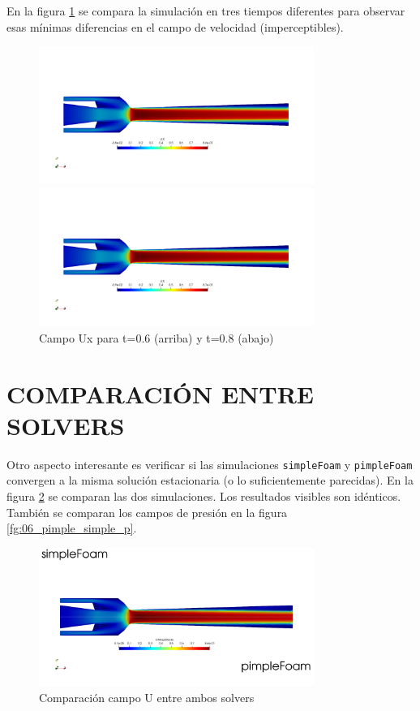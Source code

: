 \documentclass[oneside,a4paper,spanish,links]{amca}
\begin{document}
En la figura \ref{fg:05_compara_cte} se compara la simulación en tres tiempos diferentes para observar esas mínimas diferencias en el campo de velocidad (imperceptibles).

\begin{figure}[htb]
	\centerline{\includegraphics[width=0.8\textwidth]{Figuras/05_Ux_06.png}} 
	\centerline{\includegraphics[width=0.8\textwidth]{Figuras/05_Ux_08.png}} 
	\caption{Campo Ux para t=0.6 (arriba) y t=0.8 (abajo)} \label{fg:05_compara_cte}
\end{figure}

\section{COMPARACIÓN ENTRE SOLVERS}
Otro aspecto interesante es verificar si las simulaciones \texttt{simpleFoam} y \texttt{pimpleFoam} convergen a la misma solución estacionaria (o lo suficientemente parecidas). En la figura \ref{fg:06_pimple_simple} se comparan las dos simulaciones. Los resultados visibles son idénticos. También se comparan los campos de presión en la figura \ref{fg:06_pimple_simple_p}.

\begin{figure}[htb]
	\centerline{\includegraphics[width=0.8\textwidth]{Figuras/06_pimple_simple.png}} 
	\caption{Comparación campo U entre ambos solvers} \label{fg:06_pimple_simple}
\end{figure}
\end{document}
